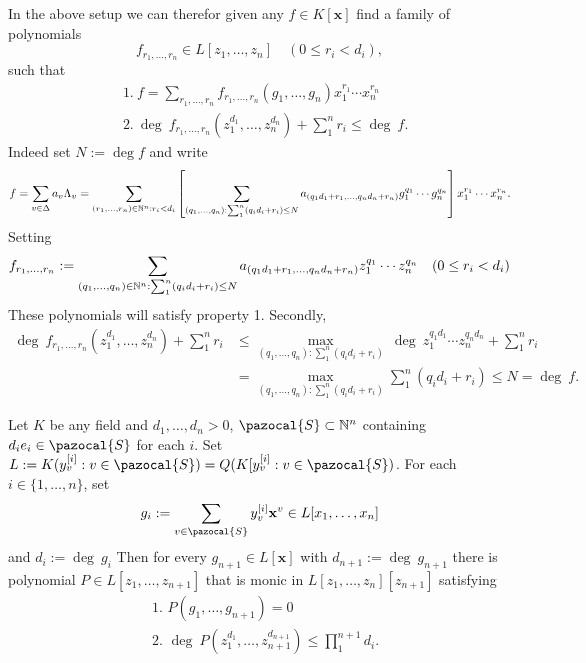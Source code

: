     \begin{remark}
        In the above setup we can therefor given any $f\in K[\mathbf{x}]$ find a family of polynomials 
        $$f_{r_1,\dots,r_n}\in L[z_1,\dots,z_n] \quad (0\leq r_i < d_i),$$
        such that
        \begin{align*}
            &\text{1.}\ f = \sum_{r_1,\dots,r_n} f_{r_1,\dots,r_n}(g_1,\dots,g_n)x_1^{r_1}\cdots x_n^{r_n}\\
            &\text{2.}\ \deg\ f_{r_1,\dots,r_n}(z_1^{d_1},\dots,z_n^{d_n})+\sum_1^n r_i\leq \deg\ f.
        \end{align*}
        Indeed set $N:=\deg f$ and write 
        $$
            f = \sum_{v\in \Delta} a_v\Lambda_v = \sum_{(r_1,\dots,r_n)\in \mathbb{N}^n: r_i<d_i} \left[\sum_{(q_1,\dots,q_n): \sum_1^n (q_id_i+r_i)\leq N} a_{(q_1d_1+r_1,\dots,q_nd_n+r_n)}g_1^{q_1}\cdots g_n^{q_n}\right]x_1^{r_1}\cdots x_n^{r_n}.
        $$
        Setting 
        $$
            f_{r_1,\dots,r_n} := \sum_{(q_1,\dots,q_n)\in \mathbb{N}^n : \sum_1^n (q_id_i+r_i)\leq N} a_{(q_1d_1+r_1,\dots,q_nd_n+r_n)} z_1^{q_1}\cdots z_n^{q_n} \quad (0\leq r_i< d_i)
        $$
        These polynomials will satisfy property 1. Secondly,
        \begin{align*}
            \deg\ f_{r_1,\dots,r_n}(z_1^{d_1},\dots,z_n^{d_n})+\sum_1^n r_i &\leq \max_{(q_1,\dots,q_n) : \sum_1^n (q_id_i+r_i)} \ \deg \ z_1^{q_1d_1}\cdots z_n^{q_nd_n} + \sum_1^n r_i\\
            &= \max_{(q_1,\dots,q_n) : \sum_1^n (q_id_i+r_i)} \sum_1^n (q_id_i+r_i) \leq N = \deg \ f.
        \end{align*}
    \end{remark}
    \begin{lemma}\label{PerronInSpecialCase}
        Let $K$ be any field and $d_1,\dots,d_n>0$, $\pazocal{S}\subset \N^n$ containing $d_ie_i\in \pazocal{S}$ for each $i$. Set $L := K(y_v^{[i]} : v\in \pazocal{S})= Q(K[y_v^{[i]} : v \in \pazocal{S})$. For each $i\in \{1,\dots,n\}$, set 
        $$g_i := \sum_{v\in\pazocal{S}} y_v^{[i]}\mathbf{x}^v \in L[x_1,\dots,x_n]$$
        and $d_i := \deg\ g_i$ Then for every $g_{n+1}\in L[\mathbf{x}]$ with $d_{n+1} := \deg \ g_{n+1}$ there is polynomial $P\in L[z_1,\dots,z_{n+1}]$ that is monic in $L[z_1,\dots,z_n][z_{n+1}]$ satisfying 
            \begin{align*}
                &\text{1. } P(g_1,\dots,g_{n+1})=0\\
                &\text{2. } \deg \ P(z_1^{d_1},\dots,z_{n+1}^{d_{n+1}}) \leq \prod_1^{n+1}d_i.
            \end{align*}    
    \end{lemma}

